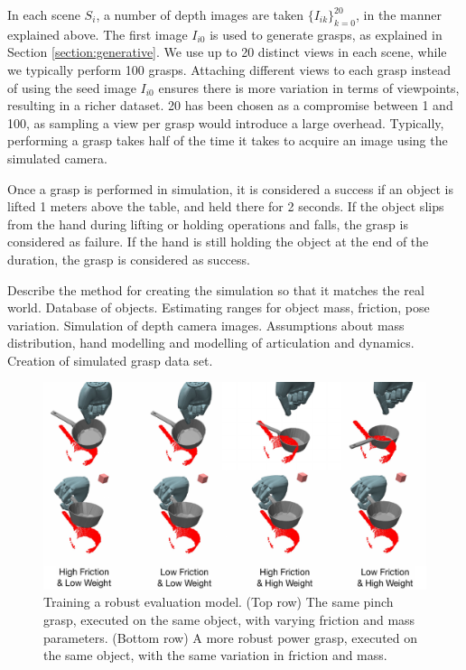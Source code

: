 In each scene $S_i$, a number of depth images are taken $\{I_{ik}\}_{k=0}^20$, in the manner explained above. The first image $I_{i0}$ is used to generate grasps, as explained in Section \ref{section:generative}. We use up to 20 distinct views in each scene, while we typically perform 100 grasps. Attaching different views to each grasp instead of using the seed image $I_{i0}$ ensures there is more variation in terms of viewpoints, resulting in a richer dataset. 20 has been chosen as a compromise between 1 and 100, as sampling a view per grasp would introduce a large overhead. Typically, performing a grasp takes half of the time it takes to acquire an image using the simulated camera.

Once a grasp is performed in simulation, it is considered a success if an object is lifted 1 meters above the table, and held there for 2 seconds. If the object slips from the hand during lifting or holding operations and falls, the grasp is considered as failure. If the hand is still holding the object at the end of the duration, the grasp is considered as success. 

Describe the method for creating the simulation so that it matches the real world. Database of objects. Estimating ranges for object mass, friction, pose variation. Simulation of depth camera images. Assumptions about mass distribution, hand modelling and modelling of articulation and dynamics. Creation of simulated grasp data set.

\begin{figure}[t]
\includegraphics[width=\columnwidth]{images/frictionweight}
\caption{Training a robust evaluation model. (Top row) The same pinch grasp, executed on the same object, with varying friction and mass parameters. (Bottom row) A more robust power grasp, executed on the same object, with the same variation in friction and mass. \label{fig:evaluative-training}}
\end{figure}
